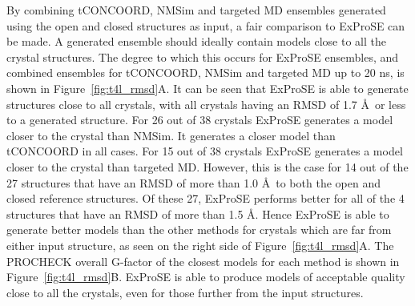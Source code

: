 \begin{figure}


\end{figure}


By combining tCONCOORD, NMSim and targeted MD ensembles generated using the open and closed structures as input, a fair comparison to ExProSE can be made.
A generated ensemble should ideally contain models close to all the crystal structures.
The degree to which this occurs for ExProSE ensembles, and combined ensembles for tCONCOORD, NMSim and targeted MD up to 20 ns, is shown in Figure~\ref{fig:t4l_rmsd}A.
It can be seen that ExProSE is able to generate structures close to all crystals, with all crystals having an RMSD of 1.7 \AA\ or less to a generated structure.
For 26 out of 38 crystals ExProSE generates a model closer to the crystal than NMSim.
It generates a closer model than tCONCOORD in all cases.
For 15 out of 38 crystals ExProSE generates a model closer to the crystal than targeted MD.
However, this is the case for 14 out of the 27 structures that have an RMSD of more than 1.0 \AA\ to both the open and closed reference structures.
Of these 27, ExProSE performs better for all of the 4 structures that have an RMSD of more than 1.5 \AA.
Hence ExProSE is able to generate better models than the other methods for crystals which are far from either input structure, as seen on the right side of Figure~\ref{fig:t4l_rmsd}A.
The PROCHECK overall G-factor of the closest models for each method is shown in Figure~\ref{fig:t4l_rmsd}B.
ExProSE is able to produce models of acceptable quality close to all the crystals, even for those further from the input structures.


